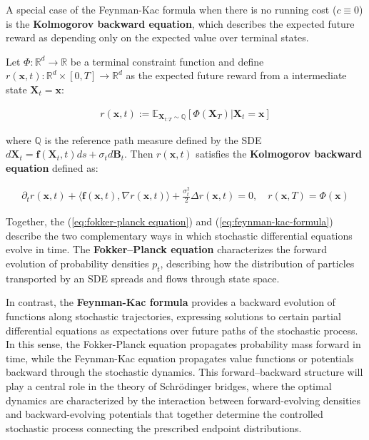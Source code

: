 \documentclass{article}
\newcommand{\boldtext}[1]{\textbf{\textcolor{MyGreen}{#1}}}
\begin{document}
A special case of the Feynman-Kac formula when there is no running cost ($c\equiv 0$) is the \boldtext{Kolmogorov backward equation}, which describes the expected future reward as depending only on the expected value over terminal states. 

\begin{corollary}\label{corollary:kolmogorov-backward}
    Let $\Phi:\mathbb{R}^d\to \mathbb{R}$ be a terminal constraint function and define $r(\boldsymbol{x},t):\mathbb{R}^d\times[0,T]\to \mathbb{R}^d$ as the expected future reward from a intermediate state $\boldsymbol{X}_t=\boldsymbol{x}$:
    \begin{small}
    \begin{align}
    r(\boldsymbol{x},t):=\mathbb{E}_{\boldsymbol{X}_{t:T}\sim \mathbb{Q}}\left[\Phi(\boldsymbol{X}_T)|\boldsymbol{X}_t=\boldsymbol{x}\right]\tag{Feynman-Kac Representation}\label{eq:feynman-kac-kolmogorov-bwd}
    \end{align}
    \end{small}
    where $\mathbb{Q}$ is the reference path measure defined by the SDE $d\boldsymbol{X}_t=\boldsymbol{f}(\boldsymbol{X}_t,t)ds+\sigma_t d\boldsymbol{B}_t$. Then $r(\boldsymbol{x},t)$ satisfies the \textbf{Kolmogorov backward equation} defined as:
    \begin{small}
    \begin{align}
        \partial_t r(\boldsymbol{x},t)+\langle\boldsymbol{f}(\boldsymbol{x},t), \nabla r(\boldsymbol{x},t)\rangle+\frac{\sigma_t^2}{2}\Delta r(\boldsymbol{x},t)=0, \quad r(\boldsymbol{x},T)=\Phi(\boldsymbol{x})\tag{Kolmogorov Backward Equation}\label{eq:kolmogorov-bwd-equation}
    \end{align}
    \end{small}
\end{corollary}

Together, the (\ref{eq:fokker-planck equation}) and (\ref{eq:feynman-kac-formula}) describe the two complementary ways in which stochastic differential equations evolve in time. The \textbf{Fokker–Planck equation} characterizes the forward evolution of probability densities $p_t$, describing how the distribution of particles transported by an SDE spreads and flows through state space. 

In contrast, the \textbf{Feynman-Kac formula} provides a backward evolution of functions along stochastic trajectories, expressing solutions to certain partial differential equations as expectations over future paths of the stochastic process. In this sense, the Fokker-Planck equation propagates probability mass forward in time, while the Feynman-Kac equation propagates value functions or potentials backward through the stochastic dynamics. This forward–backward structure will play a central role in the theory of Schrödinger bridges, where the optimal dynamics are characterized by the interaction between forward-evolving densities and backward-evolving potentials that together determine the controlled stochastic process connecting the prescribed endpoint distributions.
\end{document}
